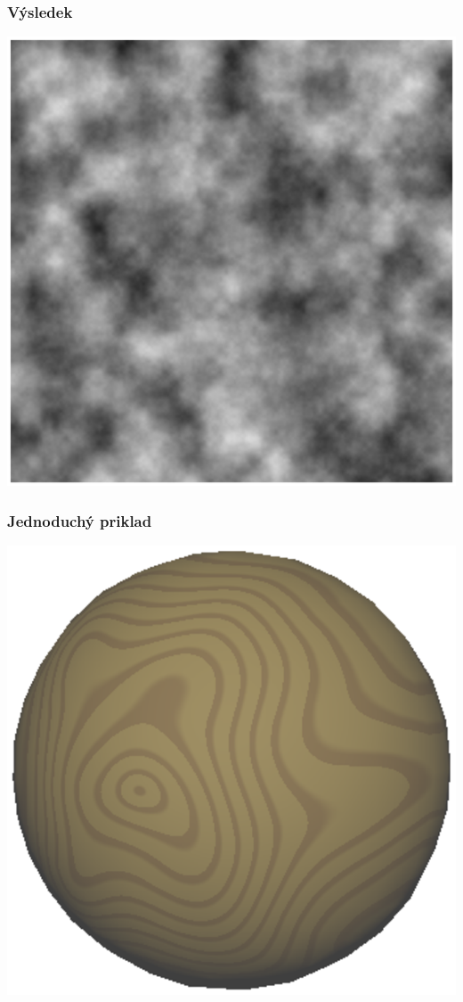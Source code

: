 \begin{frame}
    \frametitle{Výsledek}
    \includegraphics[width=\textwidth]{pics/procedural/2dnoise-fractal.eps}
\end{frame}

\begin{frame}
    \frametitle{Jednoduchý priklad}
    \includegraphics[width=\textwidth]{pics/procedural/drevo.eps}
\end{frame}
 

